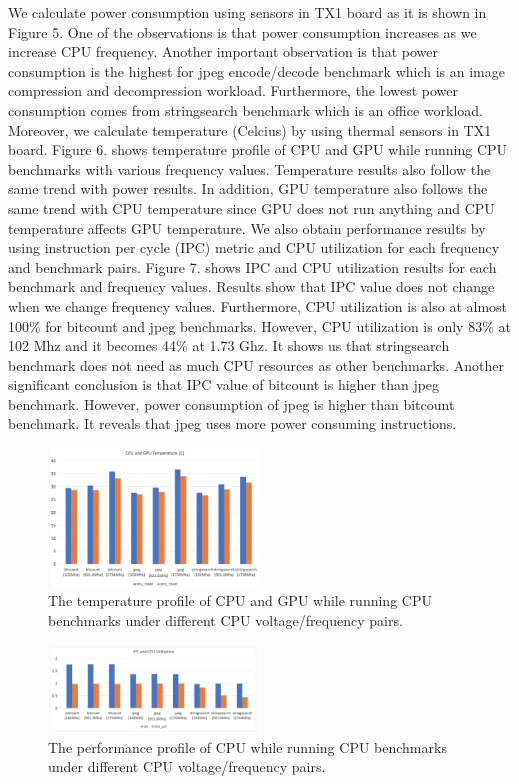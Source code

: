 We calculate power consumption using sensors in TX1 board as it is shown in Figure 5. One of the observations is that power consumption increases as we increase CPU frequency. Another important observation is that power consumption is the highest for jpeg encode/decode benchmark which is an image compression and decompression workload. Furthermore, the lowest power consumption comes from stringsearch benchmark which is an office workload. 
Moreover, we calculate temperature (Celcius) by using thermal sensors in TX1 board. Figure 6. shows temperature profile of CPU and GPU while running CPU benchmarks with various frequency values. Temperature results also follow the same trend with power results. In addition, GPU temperature also follows the same trend with CPU temperature since GPU does not run anything and CPU temperature affects GPU temperature. 
We also obtain performance results by using instruction per cycle (IPC) metric and CPU utilization for each frequency and benchmark pairs. Figure 7. shows IPC and CPU utilization results for each benchmark and frequency values. Results show that IPC value does not change when we change frequency values. Furthermore, CPU utilization is also at almost 100\% for bitcount and jpeg benchmarks. However, CPU utilization is only 83\% at 102 Mhz and it becomes 44\% at 1.73 Ghz. It shows us that stringsearch benchmark does not need as much CPU resources as other benchmarks. 
Another significant conclusion is that IPC value of bitcount is higher than jpeg benchmark. However, power consumption of jpeg is higher than bitcount benchmark. It reveals that jpeg uses more power consuming instructions.


\begin{figure}[h]
    \centering
    \includegraphics[width=0.5\textwidth]{cputemp.png}
    \caption{The temperature profile of CPU and GPU while running CPU benchmarks under different CPU voltage/frequency pairs.}\label{fig:cputemp}
\end{figure}


\begin{figure}[h]
    \centering
    \includegraphics[width=0.5\textwidth]{cpuipc.png}
    \caption{The performance profile of CPU while running CPU benchmarks under different CPU voltage/frequency pairs.}\label{fig:cpuperf}
\end{figure}